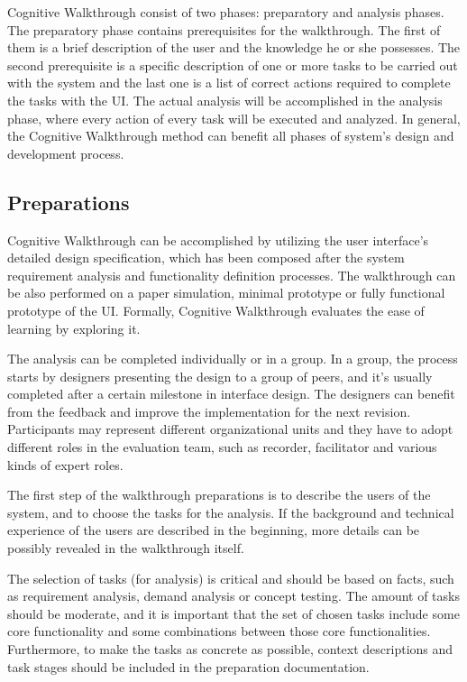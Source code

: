 \documentclass[12pt,a4paper,oneside,pdftex]{report}
\begin{document}
Cognitive Walkthrough consist of two phases: preparatory and analysis phases. The preparatory phase contains prerequisites for the walkthrough. The first of them is a brief description of the user and the knowledge he or she possesses. The second prerequisite is a specific description of one or more tasks to be carried out with the system and the last one is a list of correct actions required to complete the tasks with the UI. The actual analysis will be accomplished in the analysis phase, where every action of every task will be executed and analyzed. In general, the Cognitive Walkthrough method can benefit all phases of system's design and development process.\citep{RefWorks:26, RefWorks:34}

\subsection{Preparations}
Cognitive Walkthrough can be accomplished by utilizing the user interface's detailed design specification, which has been composed after the system requirement analysis and functionality definition processes. The walkthrough can be also performed on a paper simulation, minimal prototype or fully functional prototype of the UI. Formally, Cognitive Walkthrough evaluates the ease of learning by exploring it. \citep{RefWorks:26}

The analysis can be completed individually or in a group. In a group, the process starts by designers presenting the design to a group of peers, and it's usually completed after a certain milestone in interface design. The designers can benefit from the feedback and improve the implementation for the next revision. Participants may represent different organizational units and they have to adopt different roles in the evaluation team, such as recorder, facilitator and various kinds of expert roles. \citep{RefWorks:26}

The first step of the walkthrough preparations is to describe the users of the system, and to choose the tasks for the analysis. If the background and technical experience of the users are described in the beginning, more details can be possibly revealed in the walkthrough itself. \citep{RefWorks:26}

The selection of tasks (for analysis) is critical and should be based on facts, such as requirement analysis, demand analysis or concept testing. The amount of tasks should be moderate, and it is important that the set of chosen tasks include some core functionality and some combinations between those core functionalities. Furthermore, to make the tasks as concrete as possible, context descriptions and task stages should be included in the preparation documentation. \citep{RefWorks:26}
\end{document}
